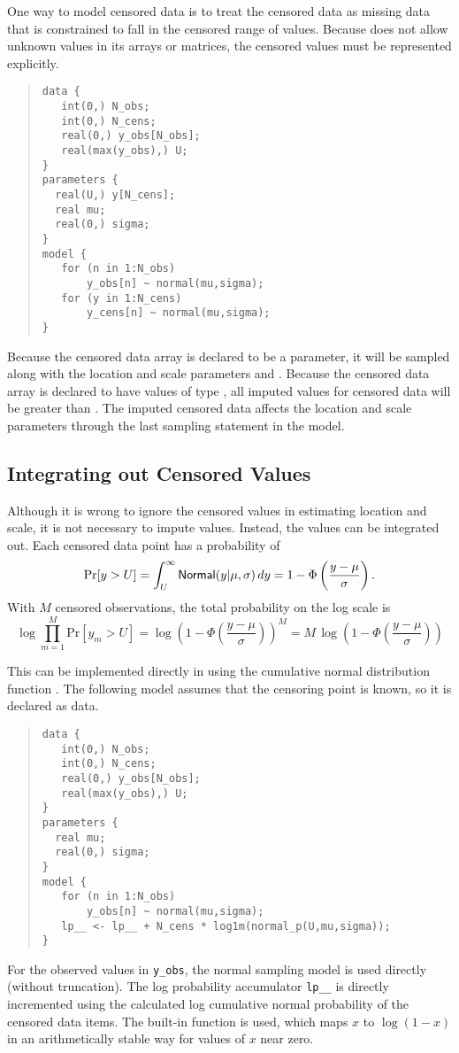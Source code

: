 One way to model censored data is to treat the censored data as
missing data that is constrained to fall in the censored range of
values.  Because \Stan does not allow unknown values in its arrays or
matrices, the censored values must be represented explicitly.
%
\begin{quote}
\begin{Verbatim}
data {
   int(0,) N_obs;
   int(0,) N_cens;
   real(0,) y_obs[N_obs];
   real(max(y_obs),) U;
}
parameters {
  real(U,) y[N_cens];
  real mu;
  real(0,) sigma;
}
model {
   for (n in 1:N_obs)
       y_obs[n] ~ normal(mu,sigma);
   for (y in 1:N_cens)
       y_cens[n] ~ normal(mu,sigma);
}
\end{Verbatim}
\end{quote}
%
Because the censored data array  is declared to be a parameter, it
will be sampled along with the location and scale parameters 
and .  Because the censored data array  is
declared to have values of type , all imputed values
for censored data will be greater than .  The imputed censored
data affects the location and scale parameters through the last
sampling statement in the model.  

\subsection{Integrating out Censored Values}

Although it is wrong to ignore the censored values in estimating
location and scale, it is not necessary to impute values.  Instead,
the values can be integrated out.  Each censored data point has a
probability of
%
\[
\mbox{Pr}[y > U] 
= \int_U^{\infty} \mbox{\sf Normal}(y|\mu,\sigma) \, dy
= 1 - \Phi\left(\frac{y - \mu}{\sigma}\right).
\]
%
With $M$ censored observations, the total probability on the log scale
is
\[
\log \prod_{m=1}^M \mbox{Pr}[y_m > U]
= \log \left( 1 - \Phi\left(\frac{y - \mu}{\sigma}\right)\right)^{M}
= M \, \log \left( 1 - \Phi\left(\frac{y - \mu}{\sigma}\right)\right)
\]

% 
This can be implemented directly in \Stan using the cumulative normal
distribution function .  The following model assumes
that the censoring point is known, so it is declared as data.
%
\begin{quote}
\begin{Verbatim}
data {
   int(0,) N_obs;
   int(0,) N_cens;
   real(0,) y_obs[N_obs];
   real(max(y_obs),) U;
}
parameters {
  real mu;
  real(0,) sigma;
}
model {
   for (n in 1:N_obs)
       y_obs[n] ~ normal(mu,sigma); 
   lp__ <- lp__ + N_cens * log1m(normal_p(U,mu,sigma));
}
\end{Verbatim}
\end{quote}
%
For the observed values in \Verb|y_obs|, the normal sampling model is
used directly (without truncation).  The log probability accumulator
\Verb|lp__| is directly incremented using the calculated log
cumulative normal probability of the censored data items.  The
built-in function  is used, which maps $x$ to $\log (1 -
x)$ in an arithmetically stable way for values of $x$ near zero.

